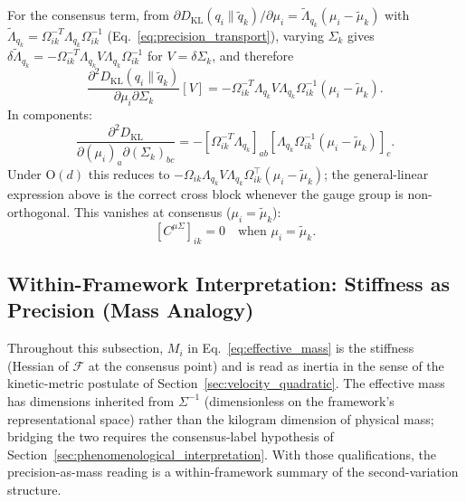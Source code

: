 \documentclass[11pt]{article}
\begin{document}
For the consensus term, from $\partial D_{\mathrm{KL}}(q_i \| \tilde{q}_k)/\partial \mu_i = \tilde{\Lambda}_{q_k}(\mu_i - \tilde{\mu}_k)$ with $\tilde{\Lambda}_{q_k} = \Omega_{ik}^{-T}\Lambda_{q_k}\Omega_{ik}^{-1}$ (Eq.~\eqref{eq:precision_transport}), varying $\Sigma_k$ gives $\delta\tilde{\Lambda}_{q_k} = -\Omega_{ik}^{-T}\Lambda_{q_k} V \Lambda_{q_k}\Omega_{ik}^{-1}$ for $V = \delta\Sigma_k$, and therefore
\begin{equation}
\frac{\partial^2 D_{\mathrm{KL}}(q_i \| \tilde{q}_k)}{\partial \mu_i \partial \Sigma_k}[V] = -\Omega_{ik}^{-T}\Lambda_{q_k} V \Lambda_{q_k} \Omega_{ik}^{-1} (\mu_i - \tilde{\mu}_k).
\end{equation}
In components:
\begin{equation}
\frac{\partial^2 D_{\mathrm{KL}}}{\partial(\mu_i)_a \partial(\Sigma_k)_{bc}} = -[\Omega_{ik}^{-T}\Lambda_{q_k}]_{ab}[\Lambda_{q_k}\Omega_{ik}^{-1}(\mu_i - \tilde{\mu}_k)]_c.
\end{equation}
Under $\mathrm{O}(d)$ this reduces to $-\Omega_{ik}\Lambda_{q_k} V \Lambda_{q_k}\Omega_{ik}^\top(\mu_i - \tilde{\mu}_k)$; the general-linear expression above is the correct cross block whenever the gauge group is non-orthogonal.
This vanishes at consensus ($\mu_i = \tilde{\mu}_k$):
\begin{equation}
\boxed{[C^{\mu\Sigma}]_{ik} = 0 \quad \text{when } \mu_i = \tilde{\mu}_k.}
\label{eq:cross_block}
\end{equation}

\subsection{Within-Framework Interpretation: Stiffness as Precision (Mass Analogy)}

Throughout this subsection, $M_i$ in Eq.~\eqref{eq:effective_mass} is the stiffness (Hessian of $\mathcal{F}$ at the consensus point) and is read as inertia in the sense of the kinetic-metric postulate of Section~\ref{sec:velocity_quadratic}. The effective mass has dimensions inherited from $\Sigma^{-1}$ (dimensionless on the framework's representational space) rather than the kilogram dimension of physical mass; bridging the two requires the consensus-label hypothesis of Section~\ref{sec:phenomenological_interpretation}. With those qualifications, the precision-as-mass reading is a within-framework summary of the second-variation structure.
\end{document}

